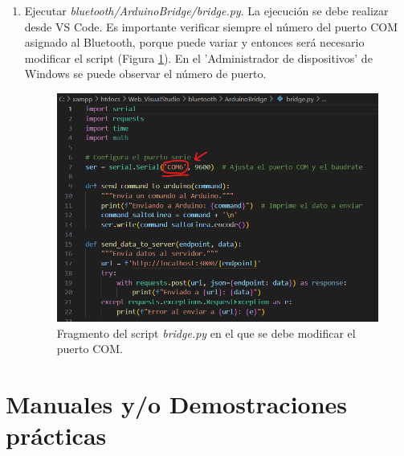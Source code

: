 \begin{enumerate}
    \item Ejecutar \textit{bluetooth/ArduinoBridge/bridge.py}. La ejecución se debe realizar desde VS Code. Es importante verificar siempre el número del puerto COM asignado al Bluetooth, porque puede variar y entonces será necesario modificar el script (Figura \ref{fig:com}). En el 'Administrador de dispositivos' de Windows se puede observar el número de puerto.
    \begin{figure}[h]
        \centering
        \includegraphics[width=1\textwidth]{img/B2_InstalacionPuestaMarcha/com.png}
        \caption{Fragmento del script \textit{bridge.py} en el que se debe modificar el puerto COM.}
        \label{fig:com}
    \end{figure}
    
\end{enumerate}


\section{Manuales y/o Demostraciones prácticas}




    
     